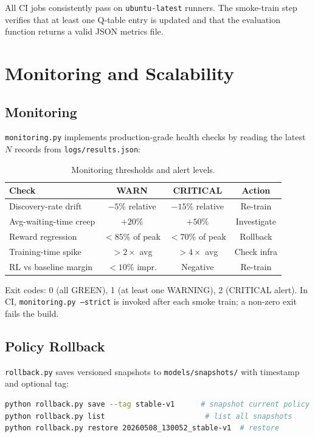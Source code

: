\documentclass[12pt,a4paper]{report}
\begin{document}
All CI jobs consistently pass on \texttt{ubuntu-latest} runners.  The
smoke-train step verifies that at least one Q-table entry is updated and
that the evaluation function returns a valid JSON metrics file.

\section{Monitoring and Scalability}

\subsection{Monitoring}

\texttt{monitoring.py} implements production-grade health checks by
reading the latest $N$ records from \texttt{logs/results.json}:

\begin{table}[H]
  \centering
  \caption{Monitoring thresholds and alert levels.}
  \label{tab:monitor}
  \begin{tabular}{lccc}
    \toprule
    \textbf{Check} & \textbf{WARN} & \textbf{CRITICAL} & \textbf{Action} \\
    \midrule
    Discovery-rate drift  & $-5\%$ relative & $-15\%$ relative & Re-train \\
    Avg-waiting-time creep& $+20\%$         & $+50\%$          & Investigate \\
    Reward regression     & $<85\%$ of peak & $<70\%$ of peak  & Rollback \\
    Training-time spike   & $>2\times$ avg  & $>4\times$ avg   & Check infra \\
    RL vs baseline margin & $<10\%$ impr.   & Negative         & Re-train \\
    \bottomrule
  \end{tabular}
\end{table}

Exit codes: 0 (all GREEN), 1 (at least one WARNING), 2 (CRITICAL alert).
In CI, \texttt{monitoring.py --strict} is invoked after each smoke train;
a non-zero exit fails the build.

\subsection{Policy Rollback}

\texttt{rollback.py} saves versioned snapshots to
\texttt{models/snapshots/} with timestamp and optional tag:

\begin{lstlisting}[language=sh, caption={Rollback CLI usage.}]
python rollback.py save --tag stable-v1      # snapshot current policy
python rollback.py list                       # list all snapshots
python rollback.py restore 20260508_130052_stable-v1  # restore
\end{lstlisting}
\end{document}
